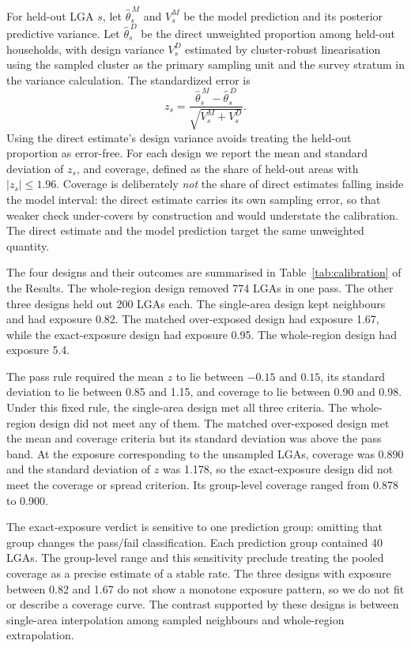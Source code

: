 For held-out LGA \(s\), let \(\widehat{\theta}^{\,M}_s\) and \(V^{M}_s\) be the model prediction and its posterior predictive variance. Let \(\widehat{\theta}^{\,D}_s\) be the direct unweighted proportion among held-out households, with design variance \(V^{D}_s\) estimated by cluster-robust linearisation using the sampled cluster as the primary sampling unit and the survey stratum in the variance calculation. The standardized error is
\[
  z_s =
  \frac{\widehat{\theta}^{\,M}_s-\widehat{\theta}^{\,D}_s}
       {\sqrt{V^{M}_s+V^{D}_s}}.
\]
Using the direct estimate's design variance avoids treating the held-out proportion as error-free. For each design we report the mean and standard deviation of \(z_s\), and coverage, defined as the share of held-out areas with \(\lvert z_s\rvert \le 1.96\). Coverage is deliberately \emph{not} the share of direct estimates falling inside the model interval: the direct estimate carries its own sampling error, so that weaker check under-covers by construction and would understate the calibration. The direct estimate and the model prediction target the same unweighted quantity.

The four designs and their outcomes are summarised in Table~\ref{tab:calibration} of the Results. The whole-region design removed 774 LGAs in one pass. The other three designs held out 200 LGAs each. The single-area design kept neighbours and had exposure 0.82. The matched over-exposed design had exposure 1.67, while the exact-exposure design had exposure 0.95. The whole-region design had exposure 5.4.

The pass rule required the mean \(z\) to lie between \(-0.15\) and \(0.15\), its standard deviation to lie between 0.85 and 1.15, and coverage to lie between 0.90 and 0.98. Under this fixed rule, the single-area design met all three criteria. The whole-region design did not meet any of them. The matched over-exposed design met the mean and coverage criteria but its standard deviation was above the pass band. At the exposure corresponding to the unsampled LGAs, coverage was 0.890 and the standard deviation of \(z\) was 1.178, so the exact-exposure design did not meet the coverage or spread criterion. Its group-level coverage ranged from 0.878 to 0.900.

The exact-exposure verdict is sensitive to one prediction group: omitting that group changes the pass/fail classification. Each prediction group contained 40 LGAs. The group-level range and this sensitivity preclude treating the pooled coverage as a precise estimate of a stable rate. The three designs with exposure between 0.82 and 1.67 do not show a monotone exposure pattern, so we do not fit or describe a coverage curve. The contrast supported by these designs is between single-area interpolation among sampled neighbours and whole-region extrapolation.

